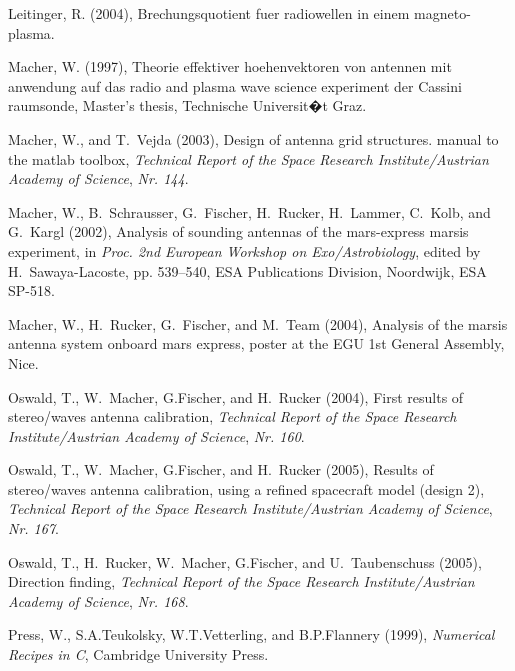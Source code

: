 \documentclass[a4paper,10pt]{thesis}
\begin{document}
\begin{thebibliography}{24}
Leitinger, R. (2004), Brechungsquotient fuer radiowellen in einem
  magneto-plasma.

Macher, W. (1997), Theorie effektiver hoehenvektoren von antennen mit anwendung
  auf das radio and plasma wave science experiment der Cassini raumsonde,
  Master's thesis, Technische Universit�t Graz.

Macher, W., and T.~Vejda (2003), Design of antenna grid structures. manual to
  the matlab toolbox, \textit{Technical Report of the Space Research
  Institute/Austrian Academy of Science}, \textit{Nr. 144}.

Macher, W., B.~Schrausser, G.~Fischer, H.~Rucker, H.~Lammer, C.~Kolb, and
  G.~Kargl (2002), Analysis of sounding antennas of the mars-express marsis
  experiment, in \textit{Proc. 2nd European Workshop on Exo/Astrobiology},
  edited by H.~Sawaya-Lacoste, pp. 539--540, ESA Publications Division,
  Noordwijk, ESA SP-518.

Macher, W., H.~Rucker, G.~Fischer, and M.~Team (2004), Analysis of the marsis
  antenna system onboard mars express, poster at the EGU 1st General Assembly,
  Nice.

Oswald, T., W.~Macher, G.Fischer, and H.~Rucker (2004), First results of
  stereo/waves antenna calibration, \textit{Technical Report of the Space
  Research Institute/Austrian Academy of Science}, \textit{Nr. 160}.

Oswald, T., W.~Macher, G.Fischer, and H.~Rucker (2005{}), Results
  of stereo/waves antenna calibration, using a refined spacecraft model (design
  2), \textit{Technical Report of the Space Research Institute/Austrian Academy
  of Science}, \textit{Nr. 167}.

Oswald, T., H.~Rucker, W.~Macher, G.Fischer, and U.~Taubenschuss
  (2005{}), Direction finding, \textit{Technical Report of the
  Space Research Institute/Austrian Academy of Science}, \textit{Nr. 168}.

Press, W., S.A.Teukolsky, W.T.Vetterling, and B.P.Flannery (1999),
  \textit{Numerical Recipes in C}, Cambridge University Press.


\end{thebibliography}
\end{document}
